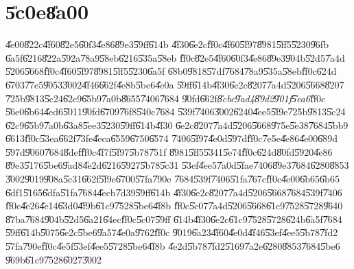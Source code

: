 \documentclass[12pt,a4paper]{article}
\begin{document}
%

\part{\U{5c0e}\U{8a00}}

\bigskip

\U{4e00}\U{822c}\U{4f60}\U{82e5}\U{60f3}\U{4e86}\U{89e3}\U{59ff}\U{614b}%
\U{4f30}\U{6e2c}\U{ff0c}\U{4f60}\U{5f97}\U{8981}\U{5ff5}\U{5230}\U{96fb}%
\U{6a5f}\U{6216}\U{822a}\U{592a}\U{78a9}\U{58eb}\U{6216}\U{535a}\U{58eb}%
\U{ff0c}\U{82e5}\U{4f60}\U{60f3}\U{4e86}\U{89e3}\U{904b}\U{52d5}\U{7a4d}%
\U{5206}\U{5668}\U{ff0c}\U{4f60}\U{5f97}\U{8981}\U{5ff5}\U{5230}\U{6a5f}%
\U{68b0}\U{9818}\U{57df}\U{7684}\U{78a9}\U{535a}\U{58eb}\U{ff0c}\U{624d}%
\U{6703}\U{77e5}\U{9053}\U{3002}\U{4f46}\U{662f}\U{4e8b}\U{5be6}\U{4e0a}%
\U{59ff}\U{614b}\U{4f30}\U{6e2c}\U{8207}\U{7a4d}\U{5206}\U{5668}\U{8207}%
\U{725b}\U{9813}\U{5c24}\U{62c9}\U{65b9}\U{7a0b}\U{8655}\U{7406}\U{7684}%
\U{90fd}\U{662f}\emph{\U{8cbc}\U{9ad4}\U{89d2}\U{901f}\U{5ea6}}\U{ff0c}%
\U{56e0}\U{6b64}\U{4ed6}\U{5011}\U{90fd}\U{6709}\U{76f8}\U{540c}\U{7684}%
\U{539f}\U{7406}\U{3002}\U{6240}\U{4ee5}\U{5f9e}\U{725b}\U{9813}\U{5c24}%
\U{62c9}\U{65b9}\U{7a0b}\U{63a8}\U{5ee3}\U{5230}\U{59ff}\U{614b}\U{4f30}%
\U{6e2c}\U{8207}\U{7a4d}\U{5206}\U{5668}\U{975e}\U{5e38}\U{7684}\U{5bb9}%
\U{6613}\U{ff0c}\U{53ea}\U{662f}\U{73fe}\U{4eca}\U{6559}\U{6750}\U{6574}%
\U{7406}\U{5f97}\U{4e0d}\U{597d}\U{ff0c}\U{7e5e}\U{4e86}\U{4e00}\U{689d}%
\U{597d}\U{9060}\U{7684}\U{8def}\U{ff0c}\U{4f7f}\U{5f97}\U{5b78}\U{751f}%
\U{8981}\U{5ff5}\U{5341}\U{5e74}\U{ff0c}\U{624d}\U{80fd}\U{5920}\U{4e86}%
\U{89e3}\U{5176}\U{5be6}\U{9ad8}\U{4e2d}\U{6216}\U{5927}\U{5b78}\U{5c31}%
\U{53ef}\U{4ee5}\U{7a0d}\U{5fae}\U{7406}\U{89e3}\U{7684}\U{6280}\U{8853}%
\U{3002}\U{9019}\U{908a}\U{5c31}\U{662f}\U{5f9e}\U{6700}\U{57fa}\U{790e}%
\U{7684}\U{539f}\U{7406}\U{51fa}\U{767c}\U{ff0c}\U{4e00}\U{6b65}\U{6b65}%
\U{6df1}\U{5165}\U{6dfa}\U{51fa}\U{7684}\U{4ecb}\U{7d39}\U{59ff}\U{614b}%
\U{4f30}\U{6e2c}\U{8207}\U{7a4d}\U{5206}\U{5668}\U{7684}\U{539f}\U{7406}%
\U{ff0c}\U{4e26}\U{4e14}\U{63d0}\U{4f9b}\U{61c9}\U{7528}\U{5be6}\U{4f8b}%
\U{ff0c}\U{5c07}\U{7a4d}\U{5206}\U{5668}\U{61c9}\U{7528}\U{5728}\U{9640}%
\U{87ba}\U{7684}\U{904b}\U{52d5}\U{6a21}\U{64ec}\U{ff0c}\U{5c07}\U{59ff}%
\U{614b}\U{4f30}\U{6e2c}\U{61c9}\U{7528}\U{5728}\U{624b}\U{6a5f}\U{7684}%
\U{59ff}\U{614b}\U{5075}\U{6e2c}\U{5be6}\U{9a57}\U{4e0a}\U{9762}\U{ff0c}%
\U{9019}\U{6a23}\U{4f60}\U{4e0d}\U{4f46}\U{53ef}\U{4ee5}\U{5b78}\U{7fd2}%
\U{57fa}\U{790e}\U{ff0c}\U{4e5f}\U{53ef}\U{4ee5}\U{5728}\U{5be6}\U{4f8b}%
\U{4e2d}\U{5b78}\U{7fd2}\U{5169}\U{7a2e}\U{6280}\U{8853}\U{7684}\U{5be6}%
\U{969b}\U{61c9}\U{7528}\U{6027}\U{3002}
\end{document}

